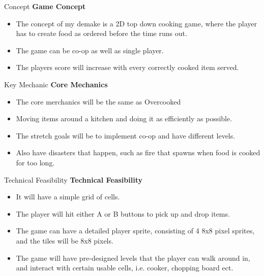 \documentclass{beamer}
\begin{document}
\begin{frame}{Concept}		
	\textbf{Game Concept} \pause
		\begin{itemize}
			\item The concept of my demake is a 2D top down cooking game, where the player has to create food as ordered before the time runs out. \pause
			\item The game can be co-op as well as single player. \pause
			\item The players score will increase with every correctly cooked item served.
			
		\end{itemize}
\end{frame}

\begin{frame}{Key Mechanic}		
	\textbf{Core Mechanics} \pause
		\begin{itemize}
		    \item The core merchanics will be the same as Overcooked \pause
			\item Moving items around a kitchen and doing it as efficiently as possible.  \pause
			\item The stretch goals will be to implement co-op and have different levels. \pause
			\item Also have disasters that happen, such as fire that spawns when food is cooked for too long.
			
		\end{itemize}
\end{frame}

\begin{frame}{Technical Feasibility}		
	\textbf{Technical Feasibility} \pause
	
		\begin{itemize}
			\item It will have a simple grid of cells. \pause
			\item The player will hit either A or B buttons to pick up and drop items.  \pause
			\item The game can have a detailed player sprite, consisting of 4 8x8 pixel sprites, and the tiles will be 8x8 pixels.  \pause
			\item The game will have pre-designed levels that the player can walk around in, and interact with certain usable cells, i.e. cooker, chopping board ect.
			
		\end{itemize}
\end{frame}
\end{document}
